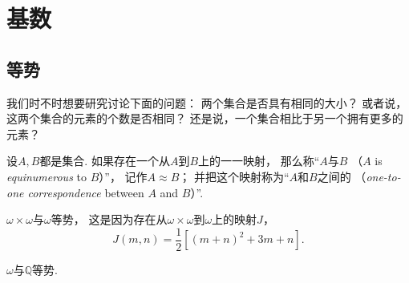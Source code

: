 \section{基数}
\subsection{等势}
我们时不时想要研究讨论下面的问题：
两个集合是否具有相同的大小？
或者说，这两个集合的元素的个数是否相同？
还是说，一个集合相比于另一个拥有更多的元素？

\begin{definition}
设\(A,B\)都是集合.
如果存在一个从\(A\)到\(B\)上的一一映射，
那么称“\(A\)与\(B\) （\(A\) is \emph{equinumerous} to \(B\)）”，
记作\(A \approx B\)；
并把这个映射称为“\(A\)和\(B\)之间的%
（\emph{one-to-one correspondence} between \(A\) and \(B\)）”.
\end{definition}

\begin{example}
\(\omega\times\omega\)与\(\omega\)等势，
这是因为存在从\(\omega\times\omega\)到\(\omega\)上的映射\(J\)，
\[
	J(m,n) = \frac{1}{2} [(m+n)^2+3m+n].
\]
\end{example}

\begin{example}
\(\omega\)与\(\mathbb{Q}\)等势.
\end{example}
